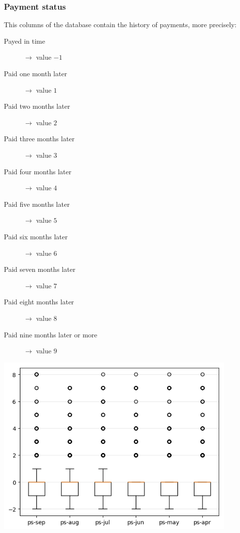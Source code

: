 \documentclass[a4paper]{article}
\begin{document}
\subsubsection{Payment status}
This columns of the database contain the history of payments, more precisely:
\begin{description}
  \item[\sc Payed in time]$\rightarrow$ value $-1$

  \item[\sc Paid one month later]$\rightarrow$ value $1$

  \item[\sc Paid two months later]$\rightarrow$ value $2$

  \item[\sc Paid three months later]$\rightarrow$ value $3$

  \item[\sc Paid four months later]$\rightarrow$ value $4$

  \item[\sc Paid five months later]$\rightarrow$ value $5$

  \item[\sc Paid six months later]$\rightarrow$ value $6$

  \item[\sc Paid seven months later]$\rightarrow$ value $7$

  \item[\sc Paid eight months later]$\rightarrow$ value $8$

  \item[\sc Paid nine months later or more]$\rightarrow$ value $9$
\end{description}
\begin{center}
\includegraphics[width=0.9\textwidth]{../Code/boxPlotsGemma/boxplots/ps.png}
\end{center}
\end{document}

